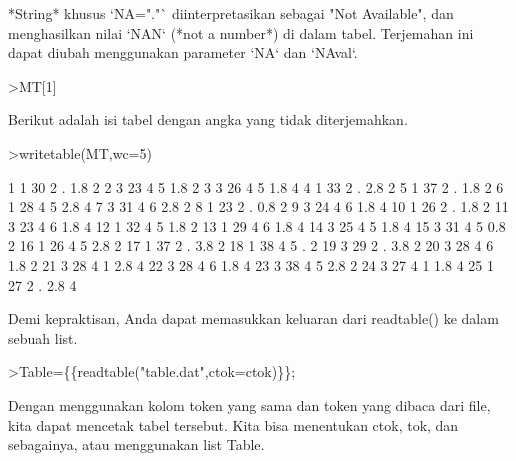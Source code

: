 \documentclass{article}
\newenvironment{eulernotebook}{\par}{\par}
\newenvironment{eulercomment}{\par\medskip}{\par\medskip}
\begin{document}
\begin{eulernotebook}
\begin{eulercomment}
*String* khusus `NA="."` diinterpretasikan sebagai "Not Available",
dan menghasilkan nilai `NAN` (*not a number*) di dalam tabel.
Terjemahan ini dapat diubah menggunakan parameter `NA` dan `NAval`.
\end{eulercomment}
\begin{eulerprompt}
>MT[1]
\end{eulerprompt}
\begin{euleroutput}
  [1,  1,  30,  2,  NAN,  1.8,  2]
\end{euleroutput}
\begin{eulercomment}
Berikut adalah isi tabel dengan angka yang tidak diterjemahkan.
\end{eulercomment}
\begin{eulerprompt}
>writetable(MT,wc=5)
\end{eulerprompt}
\begin{euleroutput}
      1    1   30    2    .  1.8    2
      2    3   23    4    5  1.8    2
      3    3   26    4    5  1.8    4
      4    1   33    2    .  2.8    2
      5    1   37    2    .  1.8    2
      6    1   28    4    5  2.8    4
      7    3   31    4    6  2.8    2
      8    1   23    2    .  0.8    2
      9    3   24    4    6  1.8    4
     10    1   26    2    .  1.8    2
     11    3   23    4    6  1.8    4
     12    1   32    4    5  1.8    2
     13    1   29    4    6  1.8    4
     14    3   25    4    5  1.8    4
     15    3   31    4    5  0.8    2
     16    1   26    4    5  2.8    2
     17    1   37    2    .  3.8    2
     18    1   38    4    5    .    2
     19    3   29    2    .  3.8    2
     20    3   28    4    6  1.8    2
     21    3   28    4    1  2.8    4
     22    3   28    4    6  1.8    4
     23    3   38    4    5  2.8    2
     24    3   27    4    1  1.8    4
     25    1   27    2    .  2.8    4
\end{euleroutput}
\begin{eulercomment}
Demi kepraktisan, Anda dapat memasukkan keluaran dari readtable() ke
dalam sebuah list.
\end{eulercomment}
\begin{eulerprompt}
>Table=\{\{readtable("table.dat",ctok=ctok)\}\};
\end{eulerprompt}
\begin{eulercomment}
Dengan menggunakan kolom token yang sama dan token yang dibaca dari
file, kita dapat mencetak tabel tersebut. Kita bisa menentukan ctok,
tok, dan sebagainya, atau menggunakan list Table.
\end{eulercomment}

\end{eulernotebook}
\end{document}
